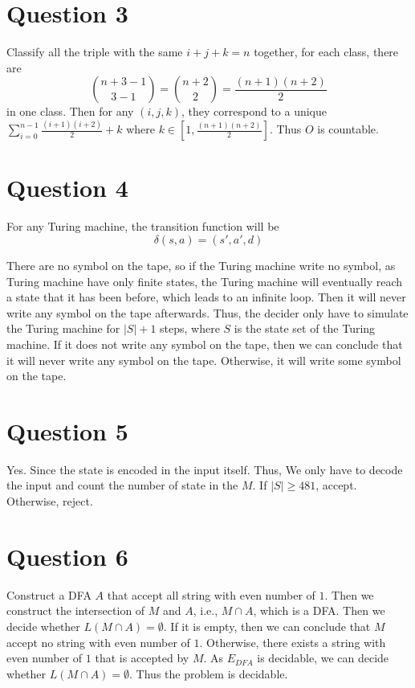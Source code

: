 \documentclass[a4paper, UTF-8]{article}
\theoremstyle{plain}
\begin{document}
\section{Question 3} 

Classify all the triple with the same $i + j + k = n$ together, for each class, there are 
$$
\binom{n + 3 - 1}{3 - 1} = \binom{n + 2}{2} = \frac{(n + 1)(n + 2)}{2}
$$
in one class. Then for any $(i, j, k)$, they correspond to a unique $\sum_{i = 0}^{n - 1} \frac{(i + 1)(i + 2)}{2} + k$ where $k \in [1, \frac{(n+1)(n+2)}{2}]$. Thus $O$ is countable.

\section{Question 4} 

For any Turing machine, the transition function will be 
$$
\delta(s, a) = (s', a', d)
$$

There are no symbol on the tape, so if the Turing machine write no symbol, as Turing machine have only finite states, the Turing machine will eventually reach a state that it has been before, which leads to an infinite loop. Then it will never write any symbol on the tape afterwards. Thus, the decider only have to simulate the Turing machine for $|S| + 1$ steps, where $S$ is the state set of the Turing machine. If it does not write any symbol on the tape, then we can conclude that it will never write any symbol on the tape. Otherwise, it will write some symbol on the tape.

\section{Question 5} 

Yes. Since the state is encoded in the input itself. Thus, We only have to decode the input and count the number of state in the $M$. If $|S| \geq 481$, accept. Otherwise, reject.

\section{Question 6} 

Construct a DFA $A$ that accept all string with even number of $1$. Then we construct the intersection of $M$ and $A$, i.e., $M \cap A$, which is a DFA. Then we decide whether $L(M \cap A) = \emptyset$. If it is empty, then we can conclude that $M$ accept no string with even number of $1$. Otherwise, there exists a string with even number of $1$ that is accepted by $M$. As $E_{DFA}$ is decidable, we can decide whether $L(M \cap A) = \emptyset$. Thus the problem is decidable.
\end{document}
